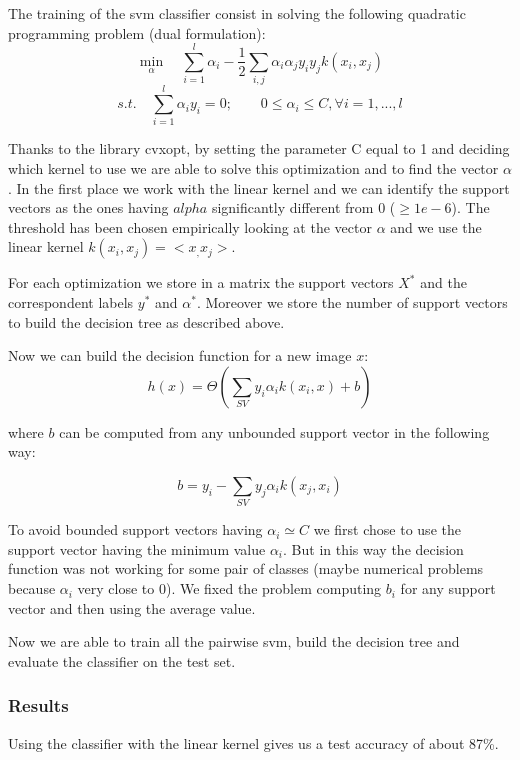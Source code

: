 \documentclass[12pt, a4paper]{report}
\begin{document}
\begin{description}
	The training of the svm classifier consist in solving the following quadratic programming problem (dual formulation):
	$$
	\min_{\alpha}\quad \sum_{i=1}^{l}\alpha_i - \frac{1}{2}\sum_{i,j} \alpha_i \alpha_j y_i y_jk(x_i,x_j)
	$$ 
	$$
	s.t. \quad \sum_{i=1}^{l} \alpha_i y_i = 0; \qquad
	0\leq \alpha_i \leq C, \forall i=1,...,l
	$$
	
	Thanks to the library cvxopt, by setting the parameter C equal to 1 and deciding which kernel to use we are able to solve this optimization and to find the vector $\alpha$.
	In the first place we work with the linear kernel and we can identify the support vectors as the ones having $alpha$ significantly different from 0 ($\geq 1e-6$).
	The threshold has been chosen empirically looking at the vector $\alpha$ and we use the linear kernel $k(x_i,x_j)= <x_,x_j>$.
	
	
	For each optimization we store in a matrix the support vectors $X^*$ and the correspondent labels $y^*$ and $\alpha^*$.
	Moreover we store the number of support vectors to build the decision tree as described above.
	
	Now we can build the decision function for a new image $x$:
	$$
	h(x) = \Theta(\sum_{SV} y_i\alpha_i k(x_i,x) + b)
	$$
	
	where $b$ can be computed from any unbounded support vector in the following way:
	
	$$
	b = y_i - \sum_{SV} y_j\alpha_ik(x_j,x_i)
	$$
	
	To avoid bounded support vectors having $\alpha_i \simeq C$ we first chose to use the support vector having the minimum value $\alpha_i$. But in this way the decision function was not working for some pair of classes (maybe numerical problems because $\alpha_i$ very close to 0). We fixed the problem computing $b_i$ for any support vector and then using the average value.
	
\end{description}

Now we are able to train all the pairwise svm, build the decision tree and evaluate the classifier on the test set.



\subsubsection*{Results}

Using the classifier with the linear kernel gives us a test accuracy of about 87\%.
\end{document}
